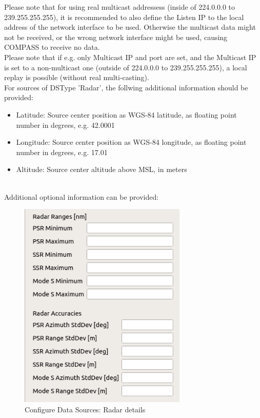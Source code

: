 Please note that for using real multicast addressess (inside of 224.0.0.0 to 239.255.255.255), it is recommended to also define the Listen IP to the local address of the network interface to be used. Otherwise the multicast data might not be received, or the wrong network interface might be used, causing COMPASS to receive no data. \\

Please note that if e.g. only Multicast IP and port are set, and the Multicast IP is set to a non-multicast one (outside of 224.0.0.0 to 239.255.255.255), a local replay is possible (without real multi-casting). \\

For sources of DSType 'Radar', the follwing additional information should be provided:

\begin{itemize}
\item Latitude: Source center position as WGS-84 latitude, as floating point number in degrees, e.g. 42.0001
\item Longitude: Source center position as WGS-84 longitude, as floating point number in degrees, e.g. 17.01
\item Altitude: Source center altitude above MSL, in meters
\end{itemize}
\ \\

Additional optional information can be provided:

\begin{figure}[H]
  \center
    \includegraphics[width=8cm,frame]{figures/configure_data_sources_radar_details.png}
  \caption{Configure Data Sources: Radar details}
\end{figure}

